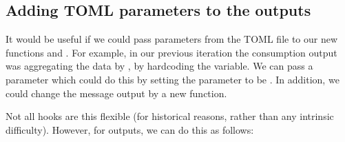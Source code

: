 \documentclass[letterpaper,10pt,english]{sphinxmanual}
\begin{document}
\subsection{Adding TOML parameters to the outputs}
\label{\detokenize{advanced-guide/extending-muse:Adding-TOML-parameters-to-the-outputs}}
It would be useful if we could pass parameters from the TOML file to our new functions  and . For example, in our previous iteration the consumption output was aggregating the data by , by hardcoding the variable. We can pass a parameter which could do this by setting the  parameter to be . In addition, we could change the message output by a new  function.

Not all hooks are this flexible (for historical reasons, rather than any intrinsic difficulty). However, for outputs, we can do this as follows:
\end{document}
